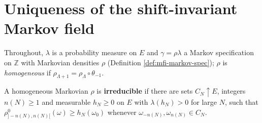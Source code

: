 \section{Uniqueness of the shift-invariant Markov field}

Throughout, $\lambda$ is a probability measure on $E$ and $\gamma = \rho\lambda$ a Markov
specification on $\mathbb Z$ with Markovian densities $\rho$ (Definition \ref{def:mfi-markov-spec});
$\rho$ is \emph{homogeneous} if $\rho_{\Lambda + 1} = \rho_\Lambda \circ \theta_{-1}$.

\begin{definition}
    \label{def:mfu-irreducible}
    \leanok

    A homogeneous Markovian $\rho$ is \textbf{irreducible} if there are sets
    $C_N \uparrow E$, integers $n(N) \geq 1$ and measurable $h_N \geq 0$ on $E$ with
    $\lambda(h_N) > 0$ for large $N$, such that
    $\rho^0_{]-n(N), n(N)[}(\omega) \geq h_N(\omega_0)$ whenever
    $\omega_{-n(N)}, \omega_{n(N)} \in C_N$.
\end{definition}

